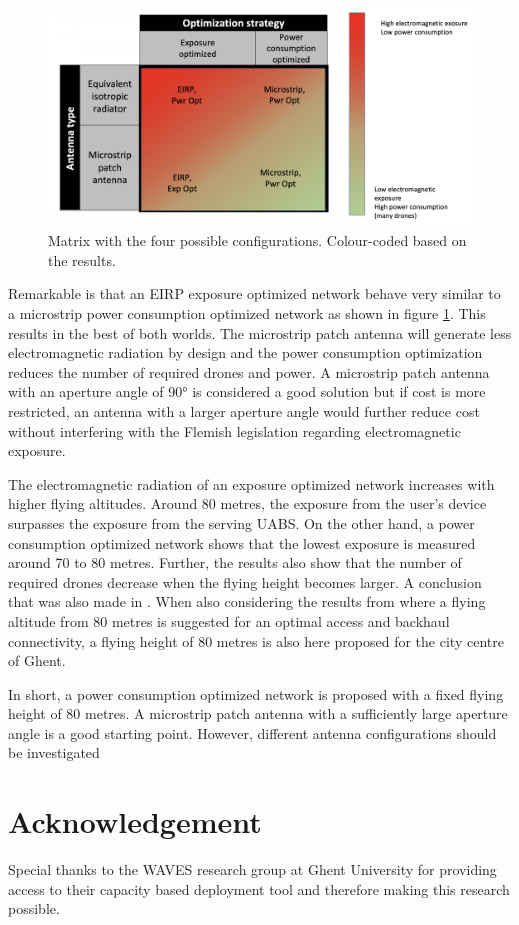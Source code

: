 \documentclass[twocolumn]{phdsymp} %
\begin{document}
\begin{figure}[h!]
  \includegraphics[width=\linewidth]{fourCasesMatrixSol.png}
  \caption{Matrix with the four possible configurations. Colour-coded based on the results.}
  \label{fig:resultIllustration}
\end{figure}

Remarkable is that an \gls{EIRP} exposure optimized network behave very similar to a microstrip power consumption optimized network as shown 
in figure \ref{fig:resultIllustration}.
This results in the best of both worlds. 
The microstrip patch antenna will generate less electromagnetic radiation by design and
 the power consumption optimization reduces the number of required drones and power. A microstrip patch antenna with an aperture 
 angle of \ang{90} is considered a good solution but if cost is more restricted, an antenna with a larger aperture angle 
 would further reduce cost without interfering with the Flemish legislation regarding electromagnetic exposure.

The electromagnetic radiation of an exposure optimized network increases with higher flying altitudes.
Around 80 metres, the exposure from the  user's device surpasses the exposure from the serving \gls{UABS}.
On the other hand, a power consumption optimized network shows that the lowest exposure is measured around 70 to 80 metres.
Further, the results also show that the number of required drones decrease when the flying height becomes larger. 
A conclusion that was also made in \cite{J2}.
When also considering the results from \cite{U1} where a flying altitude from 
80 metres is suggested for an optimal access and backhaul connectivity, a flying height 
of 80 metres is also here proposed for the city centre of Ghent.

In short, a power consumption optimized network is proposed with a fixed flying height of 80 metres. A microstrip patch 
antenna with a sufficiently large aperture angle is a good starting point. However, different antenna configurations should 
be investigated 

\section*{Acknowledgement}
Special thanks to the WAVES research group at Ghent University for providing 
access to their capacity based deployment tool and therefore making this research possible.



\end{document}
